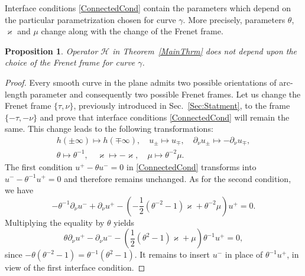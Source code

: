 \documentclass[reqno]{amsart}
\theoremstyle{plain}
\newtheorem{prop}{Proposition}
\numberwithin{equation}{section}
\renewcommand{\kappa}{\varkappa}
\newcommand{\eps}{\varepsilon}
\begin{document}
Interface conditions \eqref{ConnectedCond} contain the parameters which depend on the particular parametrization chosen for curve $\gamma$. More precisely, parameters $\theta$, $\kappa$ and $\mu$ change along with the change of the Frenet frame.

\begin{prop}\label{PropInvarianceOfCnds}
  Operator $\mathcal{H}$ in Theorem~\ref{MainThrm} does not depend upon the choice of the Frenet frame for curve $\gamma$.
\end{prop}
\begin{proof}
Every smooth curve in the plane admits two possible orientations of arc-length parameter and consequently two possible  Frenet frames. Let us change the Frenet frame $\{\tau, \nu\}$, previously introduced in Sec.~\ref{Sec:Statment}, to the frame $\{-\tau, -\nu\}$ and prove that
interface conditions \eqref{ConnectedCond} will remain the same. This change leads to the following transformations:
\begin{gather*}
h(\pm\infty)\mapsto h(\mp\infty), \quad u_\pm\mapsto u_\mp, \quad \partial_\nu u_\pm \mapsto -\partial_\nu u_\mp,\\
\theta\mapsto \theta^{-1}, \quad \kappa\mapsto -\kappa,\quad \mu\mapsto \theta^{-2}\mu.
\end{gather*}
The first condition $u^+-\theta u^-=0$ in \eqref{ConnectedCond} transforms into $u^--\theta^{-1} u^+=0$ and therefore remains unchanged. As for the second condition, we have
\begin{equation*}
 	-\theta^{-1}\partial_\nu u^-+\partial_\nu u^+
	-\left(-\textstyle\frac{1}{2}(\theta^{-2}-1)\kappa
	+\theta^{-2}\mu\right) u^+=0.
\end{equation*}
Multiplying the equality by $\theta$  yields
\begin{equation*}
	\theta\partial_\nu u^+-\partial_\nu u^-
	-\left(\textstyle\frac{1}{2 }(\theta^{2}-1)\kappa+\mu\right) 	\theta^{-1} u^+=0,
\end{equation*}
since $-\theta(\theta^{-2}-1)=\theta^{-1}(\theta^{2}-1)$. It remains to insert $u^-$ in place of $\theta^{-1} u^+$, in view of the first interface condition.
\end{proof}




%
\end{document}
